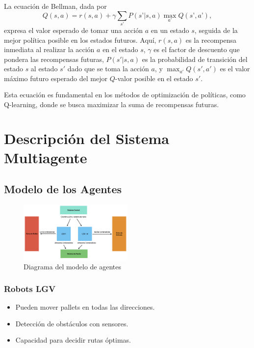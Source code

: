 \documentclass[sjournal]{IEEEtran}
\begin{document}
La ecuación de Bellman, dada por
\begin{equation}\label{Eq:Bellman}
	Q(s, a) = r(s, a) + \gamma \sum_{s’} P(s’ | s, a) \max_{a’} Q(s’, a’),
\end{equation}
expresa el valor esperado de tomar una acción \(a\) en un estado \(s\), seguida de la mejor política posible en los estados futuros. Aquí, \(r(s, a)\) es la recompensa inmediata al realizar la acción \(a\) en el estado \(s\), \(\gamma\) es el factor de descuento que pondera las recompensas futuras, \(P(s' | s, a)\) es la probabilidad de transición del estado \(s\) al estado \(s'\) dado que se toma la acción \(a\), y \(\max_{a'} Q(s', a')\) es el valor máximo futuro esperado del mejor \(Q\)-valor posible en el estado \(s'\).

Esta ecuación es fundamental en los métodos de optimización de políticas, como Q-learning, donde se busca maximizar la suma de recompensas futuras.


\section{Descripción del Sistema Multiagente}
\subsection{Modelo de los Agentes}

\begin{figure}[h!]
    \centering
    \includegraphics[width=0.5\textwidth]{modeloAgentes.png}
    \caption{Diagrama del modelo de agentes}
    \label{fig:modeloAgentes}
\end{figure}


\subsubsection*{Robots LGV}
\begin{itemize}
    \item Pueden mover pallets en todas las direcciones.
    \item Detección de obstáculos con sensores.
    \item Capacidad para decidir rutas óptimas.
\end{itemize}
\end{document}
